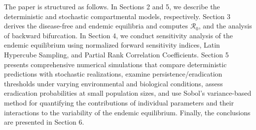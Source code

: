 \documentclass[11pt]{article}
\numberwithin{equation}{section}
\begin{document}

The paper is structured as follows. In Sections 2 and 5, we describe the deterministic and stochastic compartmental models, respectively. Section 3 derives the disease-free and endemic equilibria and computes $\mathcal{R}_0$, and the analysis of backward bifurcation. In Section 4, we conduct sensitivity analysis of the endemic equilibrium using normalized forward sensitivity indices, Latin Hypercube Sampling, and Partial Rank Correlation Coefficients. Section 5 presents comprehensive numerical simulations that compare deterministic predictions with stochastic realizations, examine persistence/eradication thresholds under varying environmental and biological conditions, assess eradication probabilities at small population sizes, and use Sobol's variance-based method for quantifying the contributions of individual parameters and their interactions to the variability of the endemic equilibrium. Finally, the conclusions are presented in Section 6.

\end{document}
